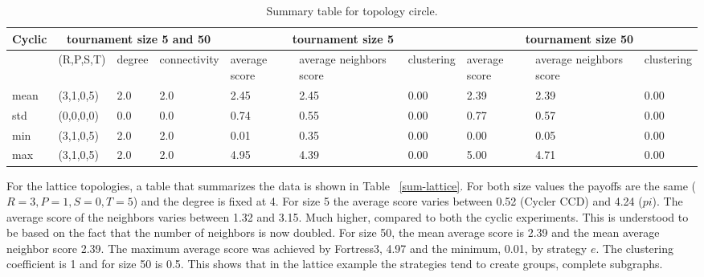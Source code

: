 \begin{table}[!hbtp]
	\centering
	\begin{adjustbox}{width=1\textwidth}
		\small
		\begin{tabular}{@{}|l|l|l|l|l|l|l|l|l|l|@{}}
			\toprule
			Cyclic & \multicolumn{3}{c|}{tournament size 5 and 50} & \multicolumn{3}{c|}{tournament size 5} & \multicolumn{3}{c|}{tournament size 50}                             \\\midrule

			     & (R,P,S,T) & degree & connectivity & average score & average neighbors score & clustering & average score & average neighbors score & clustering \\\midrule
			mean & (3,1,0,5) & 2.0    & 2.0          & 2.45          & 2.45                    & 0.00       & 2.39          & 2.39                    & 0.00       \\\midrule
			std  & (0,0,0,0) & 0.0    & 0.0          & 0.74          & 0.55                    & 0.00       & 0.77          & 0.57                    & 0.00       \\\midrule
			min  & (3,1,0,5) & 2.0    & 2.0          & 0.01          & 0.35                    & 0.00       & 0.00          & 0.05                    & 0.00       \\\midrule
			max  & (3,1,0,5) & 2.0    & 2.0          & 4.95          & 4.39                    & 0.00       & 5.00          & 4.71                    & 0.00       \\ \bottomrule
		\end{tabular}
	\end{adjustbox}
	\caption{Summary table for topology circle.}
	\label{sum-cicle}
\end{table}

For the lattice topologies, a table that summarizes the data is shown in Table
~\ref{sum-lattice}. For both size values the payoffs are the same (\(R=3, P=1,
S=0, T=5\)) and the degree is fixed at 4. For size 5 the average score
varies between 0.52 (Cycler CCD) and 4.24 ($pi$). The average score of the neighbors
varies between 1.32 and 3.15. Much higher, compared to both the cyclic experiments.
This is understood to be based on the fact that the number of neighbors is now
doubled. For size 50, the mean average score is 2.39 and the mean average neighbor
score 2.39. The maximum average score was achieved by Fortress3, 4.97 and the
minimum, 0.01, by strategy $e$. The clustering coefficient is 1 and for size
50 is 0.5. This shows that in the lattice example the strategies tend to create
groups, complete subgraphs.

